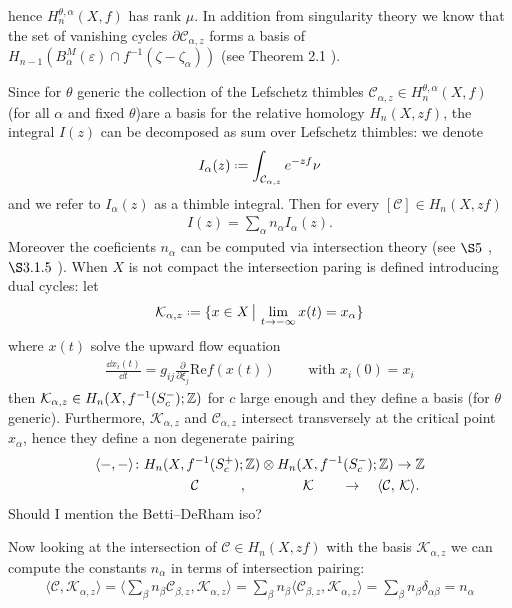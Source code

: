\documentclass[11pt,a4paper,twoside,leqno,noamsfonts]{amsart}
\numberwithin{equation}{section}
\begin{document}
hence $H_n^{\theta,\alpha}(X,f)$ has rank $\mu$. In addition from singularity theory we know that the set of vanishing cycles $\partial\mathcal{C}_{\alpha,z}$ forms a basis of $H_{n-1}(B_\alpha^M(\varepsilon)\cap f^{-1}(\zeta-\zeta_\alpha)) $ (see Theorem 2.1 \cite{Arnold}).    

  
Since for $\theta$ generic the collection of the Lefschetz thimbles $\mathcal{C}_{\alpha,z}\in H_n^{\theta,\alpha}(X,f)$ (for all $\alpha$ and fixed $\theta$)are a basis for the relative homology $H_n(X,zf)$, the integral $I(z)$ can be decomposed as sum over Lefschetz thimbles: we denote 
\begin{equation}\label{int_alpha}
I_{\alpha}(z)\defeq\int_{\mathcal{C}_{\alpha,z}}e^{-zf}\nu
\end{equation}
and we refer to $I_{\alpha}(z)$ as a thimble integral. Then  for every $[\mathcal{C}]\in H_n(X,zf)$
\begin{align*}
I(z)=\sum_{\alpha}n_\alpha I_{\alpha}(z). 
\end{align*}
Moreover the coeficients $n_\alpha$ can be computed via intersection theory (see $\S 5$ \cite{pham}, $\S 3.1.5$ \cite{Witten}). When $X$ is not compact the intersection paring is defined introducing dual cycles: let 
\begin{align*}
\mathcal{K}_{\alpha,z}\defeq\lbrace x\in X\,\big\vert\, \lim_{t\to -\infty} x(t)=x_\alpha \rbrace
\end{align*} 
where $x(t)$ solve the upward flow equation
\begin{align*}
\frac{\dd x_i(t)}{\dd t}= g_{ij}\frac{\partial}{\partial \xi_j}\mathrm{Re}f(x(t)) \qquad \text{ with } x_i(0)=x_i
\end{align*}
then $\mathcal{K}_{\alpha,z}\in H_{n}(X,f^{-1}(S^-_c);\mathbb Z)$ for $c$ large enough and they define a basis (for $\theta$ generic). Furthermore, $\mathcal{K}_{\alpha,z}$ and $\mathcal{C}_{\alpha,z}$ intersect transversely at the critical point $x_\alpha$, hence they define a non degenerate pairing 
\begin{align*}
\langle -, -\rangle\colon H_n&(X,f^{-1}(S^+_c);\mathbb Z)\otimes H_n(X,f^{-1}(S^-_c);\mathbb Z)\to \mathbb Z \\
& \qquad \mathcal{C} \qquad\quad , \qquad\qquad \mathcal{K} \qquad \to \quad \langle\mathcal{C} , \, \mathcal{K}\rangle. 
\end{align*}
\color{magenta}
Should I mention the Betti--DeRham iso? 

\color{black}


Now looking at the intersection of $\mathcal{C}\in H_n(X,zf)$ with the basis $\mathcal{K}_{\alpha,z}$ we can compute the constants $n_\alpha$ in terms of intersection pairing:
\begin{align*}
\langle \mathcal{C},\mathcal{K}_{\alpha,z}\rangle=\langle \sum_\beta n_\beta\mathcal{C}_{\beta,z},\mathcal{K}_{\alpha,z}\rangle=\sum_{\beta}n_\beta\langle \mathcal{C}_{\beta,z},\mathcal{K}_{\alpha,z}\rangle=\sum_{\beta}n_\beta\delta_{\alpha\beta}=n_\alpha
\end{align*}
\end{document}
